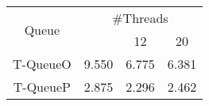 \begin{tabular}{|c|c|c|c|}
\hline
\multirow{2}{*}{Queue} & \multicolumn{3}{c|}{\#Threads}\\\cline{2-4}& \quad 4 & 12 & 20\\
\hline
\hline
T-QueueO & 9.550 & 6.775 & 6.381\\
T-QueueP & 2.875 & 2.296 & 2.462\\
\hline\end{tabular}
